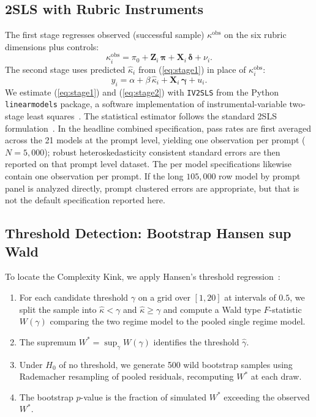 \documentclass{article}
\begin{document}
\subsection{2SLS with Rubric Instruments}
The first stage regresses observed (successful sample) $\kappa^{\text{obs}}$ on the six rubric dimensions plus controls:
\begin{equation}
\kappa_i^{\text{obs}} = \pi_0 + \mathbf{Z}_i\,\boldsymbol{\pi} + \mathbf{X}_i\,\boldsymbol{\delta} + \nu_i.
\label{eq:stage1}
\end{equation}
The second stage uses predicted $\hat{\kappa}_i$ from (\ref{eq:stage1}) in place of $\kappa_i^{\text{obs}}$:
\begin{equation}
y_i = \alpha + \beta\,\hat{\kappa}_i + \mathbf{X}_i\,\boldsymbol{\gamma} + u_i.
\label{eq:stage2}
\end{equation}
We estimate (\ref{eq:stage1}) and (\ref{eq:stage2}) with \texttt{IV2SLS} from the Python \texttt{linearmodels} package, a software implementation of instrumental-variable two-stage least squares~\cite{linearmodels}. The statistical estimator follows the standard 2SLS formulation~\cite{wooldridge2010econometric}. In the headline combined specification, pass rates are first averaged across the 21 models at the prompt level, yielding one observation per prompt ($N=5{,}000$); robust heteroskedasticity consistent standard errors are then reported on that prompt level dataset. The per model specifications likewise contain one observation per prompt. If the long $105{,}000$ row model by prompt panel is analyzed directly, prompt clustered errors are appropriate, but that is not the default specification reported here.

\subsection{Threshold Detection: Bootstrap Hansen sup Wald}
To locate the Complexity Kink, we apply Hansen's threshold regression~\cite{hansen2000sample}:
\begin{enumerate}
\item For each candidate threshold $\gamma$ on a grid over $[1, 20]$ at intervals of $0.5$, we split the sample into $\hat{\kappa}<\gamma$ and $\hat{\kappa}\geq\gamma$ and compute a Wald type $F$-statistic $W(\gamma)$ comparing the two regime model to the pooled single regime model.
\item The supremum $W^* = \sup_\gamma W(\gamma)$ identifies the threshold $\hat{\gamma}$.
\item Under $H_0$ of no threshold, we generate 500 wild bootstrap samples using Rademacher resampling of pooled residuals, recomputing $W^*$ at each draw.
\item The bootstrap $p$-value is the fraction of simulated $W^*$ exceeding the observed $W^*$.
\end{enumerate}
\end{document}
